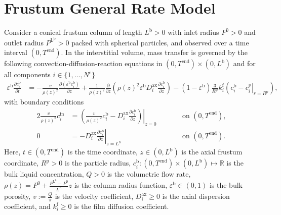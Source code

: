 \documentclass{article}
\begin{document}
\section*{Frustum General Rate Model}
Consider a conical frustum column of length $L^{\mathrm{b}} > 0$ with inlet radius $P^{\mathrm{0}} > 0$ and outlet radius $P^{\mathrm{L^{\mathrm{b}}}} > 0$ packed with spherical particles, and observed over a time interval $(0, T^{\mathrm{end}})$.
In the interstitial volume, mass transfer is governed by the following convection-diffusion-reaction equations in $(0, T^{\mathrm{end}})\times (0, L^{\mathrm{b}})$ and for all components $i\in\{1, \dots, N^{\mathrm{c}} \}$
\begin{align}
    \varepsilon^{\mathrm{b}} \frac{\partial c^{\mathrm{b}}_{i}}{\partial t}
    &= - \frac{v}{\rho(z)^{2}} \frac{\partial \left( \varepsilon^{\mathrm{b}} c^{\mathrm{b}}_{i} \right)}{\partial z}
        + \frac{1}{\rho(z)^{2}} \frac{\partial}{\partial z} \left( \rho(z)^{2} \varepsilon^{\mathrm{b}} D^{\mathrm{ax}}_{i} \frac{\partial c^{\mathrm{b}}_{i}}{\partial z} \right)
        - \left(1 - \varepsilon^{\mathrm{b}} \right) \frac{3}{R^{\mathrm{p}}} k^{\mathrm{f}}_{i} \left(c^{\mathrm{b}}_{i} - \left. c^{\mathrm{p}}_{i} \right|_{r = R^{\mathrm{p}}} \right),
\end{align}
with boundary conditions
\begin{alignat}{2}
    \frac{v}{\rho(z)^{2}} c^{\mathrm{in}}_{i}
    &= \left.\left( \frac{v}{\rho(z)^{2}} c^{\mathrm{b}}_{i} - D^{\mathrm{ax}}_{i} \frac{\partial c^{\mathrm{b}}_{i}}{\partial z}\right)\right|_{z=0}
    & & \qquad\text{on }(0, T^{\mathrm{end}}),
    \\
    0
    &= - D^{\mathrm{ax}}_{i} \left. \frac{\partial c^{\mathrm{b}}_{i}}{\partial z} \right|_{z=L^{\mathrm{b}}}
    & & \qquad\text{on }(0, T^{\mathrm{end}}).
\end{alignat}
Here, $t\in (0, T^{\mathrm{end}})$ is the time coordinate, $z\in (0, L^{\mathrm{b}})$ is the axial frustum coordinate, $R^{\mathrm{p}}> 0$ is the particle radius, $c^{\mathrm{b}}_{i}\colon (0, T^{\mathrm{end}})\times (0, L^{\mathrm{b}}) \mapsto \mathbb{R}$ is the bulk liquid concentration, $Q> 0$ is the volumetric flow rate, $\rho(z) = P^{\mathrm{0}} + \frac{P^{\mathrm{L^{\mathrm{b}}}} - P^{\mathrm{0}}}{L^{\mathrm{b}}} z$ is the column radius function, $\varepsilon^{\mathrm{b}}\in (0, 1)$ is the bulk porosity, $v:= \frac{Q}{\pi}$ is the velocity coefficient, $D^{\mathrm{ax}}_{i}\geq 0$ is the axial dispersion coefficient, and $k^{\mathrm{f}}_{i}\geq 0$ is the film diffusion coefficient.
\end{document}
